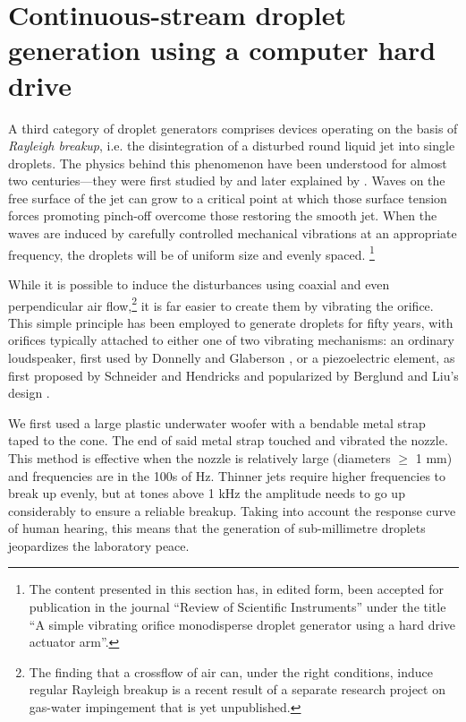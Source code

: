 \documentclass[11.5pt,oneside]{book}
\begin{document}
\section{Continuous-stream droplet generation using a computer hard drive}

A third category of droplet generators comprises devices operating on the basis
of \emph{Rayleigh breakup}, i.e. the disintegration of a disturbed round liquid
jet into single droplets. The physics behind this phenomenon have been
understood for almost two centuries—they were first studied
by \citet{Savart33} and later explained by \citet{Rayleigh79}. Waves on
the free surface of the jet can grow to a critical point at which those surface
tension forces promoting pinch-off overcome those restoring the smooth jet. When
the waves are induced by carefully controlled mechanical vibrations at an
appropriate frequency, the droplets will be of uniform size and evenly spaced.
\footnote{The content presented in this section has, in edited form,
        been accepted for publication in the journal ``Review of Scientific
        Instruments'' under the title ``A simple vibrating orifice monodisperse
 droplet generator using a hard drive actuator arm''.}

While it is possible to induce the disturbances using coaxial \cite{Green89} and
even perpendicular air flow,\footnote{The finding that a crossflow of air can,
        under the right conditions, induce regular Rayleigh breakup is a recent
        result of a separate research project on gas-water impingement that is
yet unpublished.} it is far easier to create them by vibrating the orifice.
This simple principle has been employed to generate droplets for fifty years,
with orifices typically attached to either one of two vibrating mechanisms: an
ordinary loudspeaker, first used by Donnelly and Glaberson \cite{Donnelly66}, or
a piezoelectric element, as first proposed by Schneider and
Hendricks \cite{Schneider64} and popularized by Berglund and Liu's
design \cite{Berglund73}. 

We first used a large plastic underwater woofer with a bendable metal strap taped to
the cone. The end of said metal strap touched and vibrated the nozzle. This
method is effective when the nozzle is relatively large (diameters $\geq$ 1 mm)
and frequencies are in the 100s of Hz. Thinner jets require higher frequencies
to break up evenly, but at tones above 1 kHz the amplitude needs to go up
considerably to ensure a reliable breakup. Taking into account the response
curve of human hearing, this means that the generation of sub-millimetre
droplets jeopardizes the laboratory peace.
\end{document}
